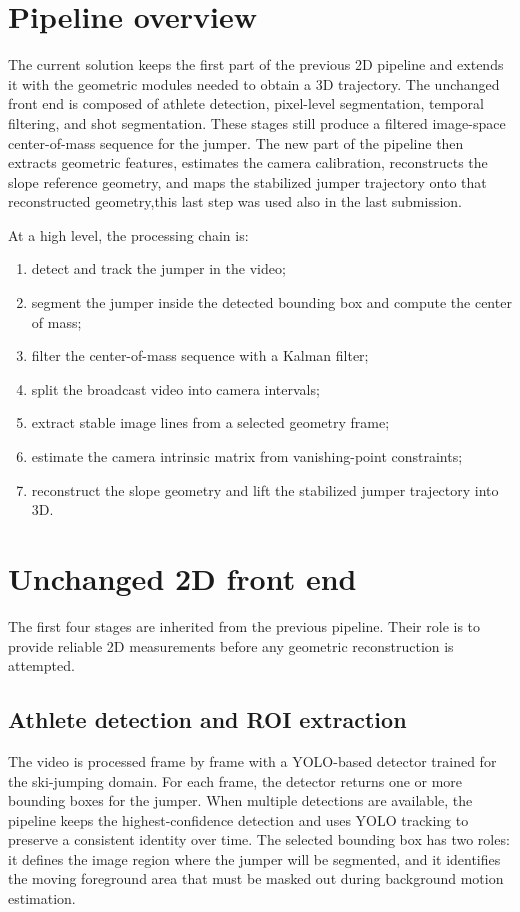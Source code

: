 \section{Pipeline overview}
The current solution keeps the first part of the previous 2D pipeline and extends it with the geometric modules needed to obtain a 3D trajectory. The unchanged front end is composed of athlete detection, pixel-level segmentation, temporal filtering, and shot segmentation. These stages still produce a filtered image-space center-of-mass sequence for the jumper. The new part of the pipeline then extracts geometric features, estimates the camera calibration, reconstructs the slope reference geometry, and maps the stabilized jumper trajectory onto that reconstructed geometry,this last step was used also in the last submission.

\medskip

At a high level, the processing chain is:
\begin{enumerate}
    \item detect and track the jumper in the video;
    \item segment the jumper inside the detected bounding box and compute the center of mass;
    \item filter the center-of-mass sequence with a Kalman filter;
    \item split the broadcast video into camera intervals;
    \item extract stable image lines from a selected geometry frame;
    \item estimate the camera intrinsic matrix from vanishing-point constraints;
    \item reconstruct the slope geometry and lift the stabilized jumper trajectory into 3D.
\end{enumerate}

\section{Unchanged 2D front end}
The first four stages are inherited from the previous pipeline. Their role is to provide reliable 2D measurements before any geometric reconstruction is attempted.

\subsection{Athlete detection and ROI extraction}
The video is processed frame by frame with a YOLO-based detector trained for the ski-jumping domain. For each frame, the detector returns one or more bounding boxes for the jumper. When multiple detections are available, the pipeline keeps the highest-confidence detection and uses YOLO tracking to preserve a consistent identity over time. The selected bounding box has two roles: it defines the image region where the jumper will be segmented, and it identifies the moving foreground area that must be masked out during background motion estimation.

